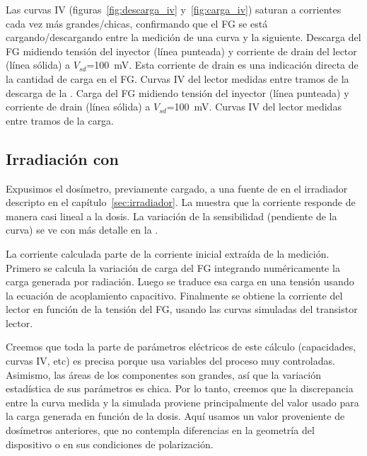 Las curvas IV (figuras~\ref{fig:descarga_iv}
y~\ref{fig:carga_iv}) saturan a corrientes cada vez más grandes/chicas,
confirmando que el FG se está cargando/descargando 
entre la medición de una curva y la siguiente.
{Descarga del FG midiendo tensión del inyector (línea punteada) y
corriente de drain del lector (línea sólida) a
$V_{sd}$=\SI{100}{\milli\volt}.
Esta corriente de drain es una indicación directa 
de la cantidad de carga en el FG.}
{Curvas IV del lector medidas entre tramos de la descarga
    de la .}
{Carga del FG midiendo tensión del inyector (línea punteada) y
corriente de drain (línea sólida) a
$V_{sd}$=\SI{100}{\milli\volt}.}
{Curvas IV del lector medidas entre tramos de la carga.}
\subsection{Irradiación con \Strontium}
Expusimos el dosímetro,
previamente cargado,
a una fuente de \Strontium
en el irradiador descripto en el capítulo~\ref{sec:irradiador}.
La  muestra que la corriente responde de
manera casi lineal a la dosis.
La variación de la sensibilidad (pendiente de la curva)
se ve con más detalle en la .

La corriente calculada parte de la corriente inicial extraída de la
medición.
Primero se calcula la variación de carga del FG
integrando numéricamente la carga generada por radiación.
Luego se traduce esa carga en una tensión
usando la ecuación de acoplamiento capacitivo.
Finalmente se obtiene la corriente del lector
en función de la tensión del FG,
usando las curvas simuladas del transistor lector.

Creemos que toda la parte de parámetros eléctricos de este cálculo
(capacidades, curvas IV, etc) es precisa
porque usa variables del proceso muy controladas.
Asimismo, las áreas de los componentes son grandes,
así que la variación estadística de sus parámetros es chica.
Por lo tanto, creemos que la discrepancia entre
la curva medida y la simulada
proviene principalmente del valor usado para la
carga generada en función de la dosis.
Aquí usamos un valor proveniente de dosímetros anteriores,
que no contempla diferencias en la geometría del dispositivo
o en sus condiciones de polarización.

